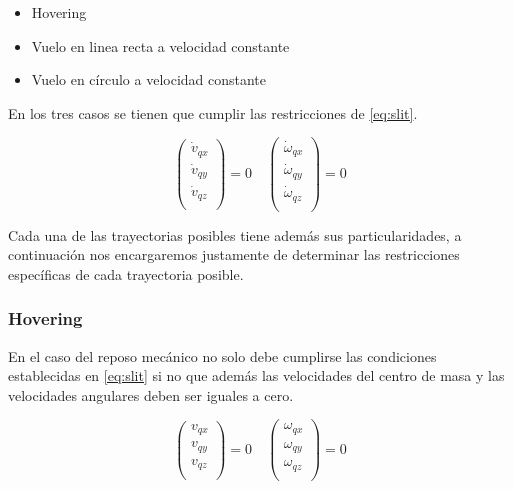 \documentclass[main]{subfiles}
\begin{document}
\begin{itemize}
\item Hovering
\item Vuelo en linea recta a velocidad constante
\item Vuelo en c\'irculo a velocidad constante 
\end{itemize} 

En los tres casos se tienen que cumplir las restricciones de  \ref{eq:slit}.

\begin{equation}
\label{eq:slit}
\left(\begin{array}{c}
\dot{v}_{qx}\\
\dot{v}_{qy}\\
\dot{v}_{qz}\\
\end{array}\right)=0 \quad 
\left(\begin{array}{c}
\dot{\omega}_{qx}\\
\dot{\omega}_{qy}\\
\dot{\omega}_{qz}\\
\end{array}\right)=0
\end{equation}

Cada una de las trayectorias posibles tiene adem\'as sus particularidades, a continuaci\'on nos encargaremos justamente de determinar las restricciones espec\'ificas de cada trayectoria posible. 

\subsubsection{Hovering}
En el caso del reposo mec\'anico no solo debe cumplirse las condiciones establecidas en \ref{eq:slit} si no que adem\'as las velocidades del centro de masa y las velocidades angulares deben ser iguales a cero.

\begin{equation}
\label{eq:quieto}
\left(\begin{array}{c}
v_{qx}\\
v_{qy}\\
v_{qz}\\
\end{array}\right)=0 \quad
\left(\begin{array}{c}
\omega_{qx}\\
\omega_{qy}\\
\omega_{qz}\\
\end{array}\right)=0
\end{equation}
\end{document}
